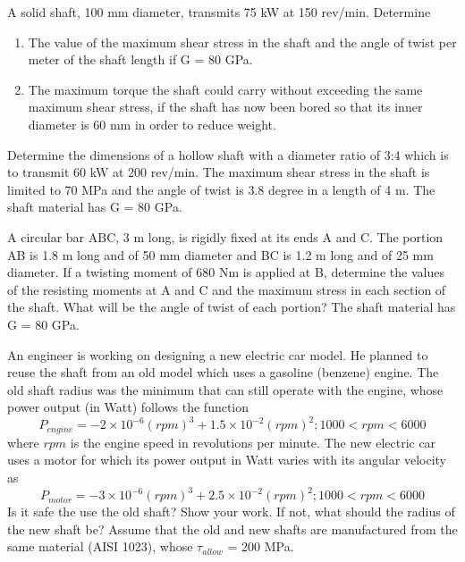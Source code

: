 \documentclass[
10pt,
a4paper,
openany,
svgnames,
]{book} %
\begin{document}
\begin{exercises}

  \exercise A solid shaft, 100 mm diameter, transmits 75 kW at 150 rev/min. Determine

  \begin{figure}[H]
    \centering
  \end{figure}
  
  \begin{enumerate}
  \item The value of the maximum shear stress in the shaft and the angle of twist per meter of the shaft length if G = 80 GPa.
  \item The maximum torque the shaft could carry without exceeding the same maximum shear stress, if the shaft has now been bored so that its inner diameter is 60 mm in order to reduce weight.
  \end{enumerate}
  
  \exercise  Determine the dimensions of a hollow shaft with a diameter ratio of 3:4 which is to transmit 60 kW at 200 rev/min. The maximum shear stress in the shaft is limited to 70 MPa and the angle of twist is 3.8 degree in a length of 4 m. The shaft material has G = 80 GPa.

  \exercise A circular bar ABC, 3 m long, is rigidly fixed at its ends A and C. The portion AB is 1.8 m long and of 50 mm diameter and BC is 1.2 m long and of 25 mm diameter. If a twisting moment of 680 Nm is applied at B, determine the values of the resisting moments at A and C and the maximum stress in each section of the shaft. What will be the angle of twist of each portion? The shaft material has G = 80 GPa.

  \exercise An engineer is working on designing a new electric car model. He planned to reuse the shaft from an old model which uses a gasoline (benzene) engine. The old shaft radius was the minimum that can still operate with the engine, whose power output (in Watt) follows the function
	$$ P_{engine} = -2\times10^{-6} (rpm)^3 + 1.5 \times 10^{-2} (rpm)^2; 1000 < rpm < 6000 $$ 
where $rpm$ is the engine speed in revolutions per minute. The new electric car uses a motor for which its power output in Watt varies with its angular velocity as
	$$ P_{motor} = -3 \times 10^{-6}(rpm)^3 + 2.5 \times 10^{-2} (rpm)^2; 1000 < rpm < 6000 $$
        Is it safe the use the old shaft? Show your work. If not, what should the radius of the new shaft be? Assume that the old and new shafts are manufactured from the same material (AISI 1023), whose $\tau_{allow}$ = 200 MPa.
        
\end{exercises}
\end{document}
